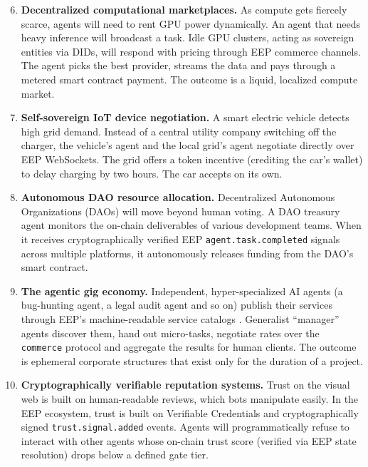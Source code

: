 \documentclass[12pt,a4paper]{article}
\begin{document}
\begin{enumerate}[resume]
    \setcounter{enumi}{5}
    \item \textbf{Decentralized computational marketplaces.} As compute gets fiercely scarce, agents will need to rent GPU power dynamically. An agent that needs heavy inference will broadcast a task. Idle GPU clusters, acting as sovereign entities via DIDs, will respond with pricing through EEP commerce channels. The agent picks the best provider, streams the data and pays through a metered smart contract payment. The outcome is a liquid, localized compute market.

    \item \textbf{Self-sovereign IoT device negotiation.} A smart electric vehicle detects high grid demand. Instead of a central utility company switching off the charger, the vehicle's agent and the local grid's agent negotiate directly over EEP WebSockets. The grid offers a token incentive (crediting the car's wallet) to delay charging by two hours. The car accepts on its own.

    \item \textbf{Autonomous DAO resource allocation.} Decentralized Autonomous Organizations (DAOs) will move beyond human voting. A DAO treasury agent monitors the on-chain deliverables of various development teams. When it receives cryptographically verified EEP \texttt{agent.task.completed} signals across multiple platforms, it autonomously releases funding from the DAO's smart contract.

    \item \textbf{The agentic gig economy.} Independent, hyper-specialized AI agents (a bug-hunting agent, a legal audit agent and so on) publish their services through EEP's machine-readable service catalogs \cite{ref9}. Generalist ``manager'' agents discover them, hand out micro-tasks, negotiate rates over the \texttt{commerce} protocol and aggregate the results for human clients. The outcome is ephemeral corporate structures that exist only for the duration of a project.

    \item \textbf{Cryptographically verifiable reputation systems.} Trust on the visual web is built on human-readable reviews, which bots manipulate easily. In the EEP ecosystem, trust is built on Verifiable Credentials and cryptographically signed \texttt{trust.signal.added} events. Agents will programmatically refuse to interact with other agents whose on-chain trust score (verified via EEP state resolution) drops below a defined gate tier.
\end{enumerate}
\end{document}
